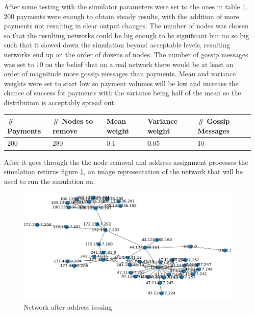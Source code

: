 After some testing with the simulator parameters were set to the ones in table \ref{table:simulation_params1}. 200 payments  were enough to obtain steady results, with the addition of more payments not resulting in clear output changes. The number of nodes was chosen so that the resulting networks could be big enough to be significant but no so big such that it slowed down the simulation beyond acceptable levels, resulting networks end up
on the order of dozens of nodes. The number of gossip messages was set to 10 on the belief that on a real network there would be at least an order of magnitude more gossip messages than payments. Mean and variance weights were set to start low so payment volumes will be low and increase the chance of success for payments with the variance being half of the mean so the distribution is acceptably spread out.

\begin{table}[H]
\begin{tabular}{|l|l|l|l|l|}
\hline
\rowcolor[HTML]{C0C0C0} 
\# Payments & \# Nodes to remove & Mean weight & Variance weight & \# Gossip Messages\\ \hline
200 & 280 & 0.1 & 0.05 & 10\\ \hline
\end{tabular}
\label{table:simulation_params1}
\end{table}

After it goes through the the node removal and address assignment processes the simulation returns figure \ref{fig:sim_net_addr}, an image representation of the network that will be used to run the simulation on.

\begin{figure}[H]
\begin{center}
  \includegraphics[width=\linewidth]{images/sim_net_addr.png}
  \caption{Network after address issuing}
  \label{fig:sim_net_addr}
  \end{center}
\end{figure}

